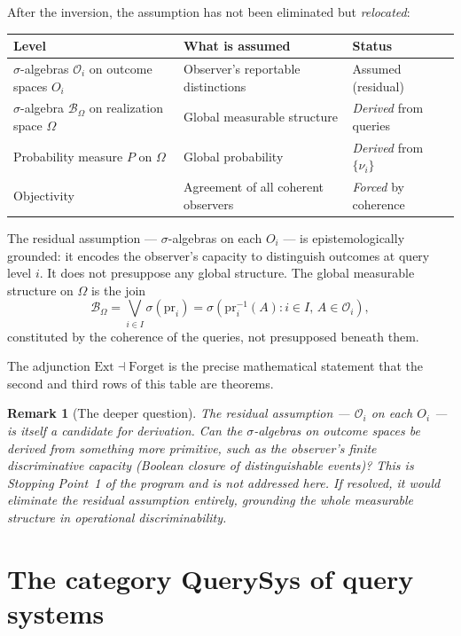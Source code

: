 \documentclass[11pt]{article}
\newtheorem{remark}{Remark}
\newcommand{\QSys}{\mathbf{QuerySys}}
\newcommand{\Ocal}{\mathcal{O}}
\newcommand{\Bcal}{\mathcal{B}}
\newcommand{\pr}{\mathrm{pr}}
\newcommand{\Ext}{\mathrm{Ext}}
\newcommand{\Forget}{\mathrm{Forget}}
\begin{document}
After the inversion, the assumption has not been eliminated but
\emph{relocated}:

\begin{center}
\renewcommand{\arraystretch}{1.4}
\begin{tabular}{lll}
\hline
\textbf{Level} & \textbf{What is assumed} & \textbf{Status} \\
\hline
$\sigma$-algebras $\Ocal_i$ on outcome spaces $O_i$
  & Observer's reportable distinctions
  & Assumed (residual) \\
$\sigma$-algebra $\Bcal_\Omega$ on realization space $\Omega$
  & Global measurable structure
  & \emph{Derived} from queries \\
Probability measure $P$ on $\Omega$
  & Global probability
  & \emph{Derived} from $\{\nu_i\}$ \\
Objectivity
  & Agreement of all coherent observers
  & \emph{Forced} by coherence \\
\hline
\end{tabular}
\end{center}

The residual assumption --- $\sigma$-algebras on each $O_i$ --- is
epistemologically grounded: it encodes the observer's capacity to distinguish
outcomes at query level $i$.  It does not presuppose any global structure.
The global measurable structure on $\Omega$ is the join
\[
  \Bcal_\Omega = \bigvee_{i \in I} \sigma(\pr_i)
  = \sigma\!\left(\pr_i^{-1}(A) : i \in I,\, A \in \Ocal_i\right),
\]
constituted by the coherence of the queries, not presupposed beneath them.

The adjunction $\Ext \dashv \Forget$ is the precise mathematical statement
that the second and third rows of this table are theorems.

\begin{remark}[The deeper question]
The residual assumption --- $\Ocal_i$ on each $O_i$ --- is itself a candidate
for derivation.  Can the $\sigma$-algebras on outcome spaces be derived from
something more primitive, such as the observer's finite discriminative
capacity (Boolean closure of distinguishable events)?  This is Stopping
Point~1 of the program and is not addressed here.  If resolved, it would
eliminate the residual assumption entirely, grounding the whole measurable
structure in operational discriminability.
\end{remark}

\section{The category $\QSys$ of query systems}
\label{sec:qsys}
\end{document}
